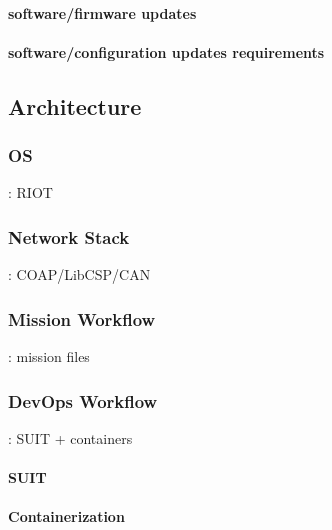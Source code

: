 \paragraph*{software/firmware updates}
\paragraph*{software/configuration updates requirements}

\subsection{Architecture}
\subsubsection{OS}: RIOT
\subsubsection{Network Stack}: COAP/LibCSP/CAN
\subsubsection{Mission Workflow}: mission files
\subsubsection{DevOps Workflow}: SUIT + containers
\paragraph*{SUIT}
\paragraph*{Containerization}

